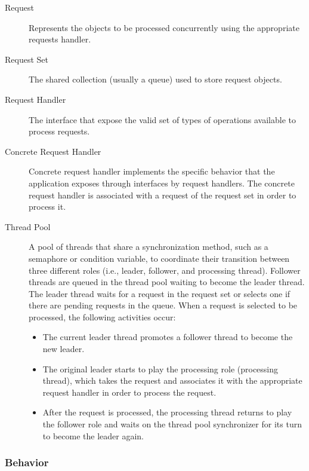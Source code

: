 \begin{description}
	
	\item[Request]
	Represents the objects to be processed concurrently using the appropriate requests handler.
	
	\item[Request Set]
	The shared collection (usually a queue) used to store request objects.
	
	\item[Request Handler]
	The interface that expose the valid set of types of operations available to process requests.
	
	\item[Concrete Request Handler]
	Concrete request handler implements the specific behavior that the application exposes through interfaces by request handlers. The concrete request handler is associated with a request of the request set in order to process it.
	
	\item[Thread Pool]
	A pool of threads that share a synchronization method, such as a semaphore or condition variable, to coordinate their transition between three different roles (i.e., leader, follower, and processing thread).  Follower threads are queued in the thread pool waiting to become the leader thread. The leader thread waits for a request in the request set or selects one if there are pending requests in the queue. When a request is selected to be processed, the following activities occur:
	
	\begin{itemize}
		\item  The current leader thread promotes a follower thread to become the new leader.
		
		\item  The original leader starts to play the processing role (processing thread), which takes the request and associates it with the appropriate request handler in order to process the request.
		
		\item  After the request is processed, the processing thread returns to play the follower role and waits on the thread pool synchronizer for its turn to become the leader again. 
	\end{itemize}
	
\end{description}

\subsubsection{Behavior}

